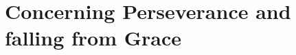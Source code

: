 \documentclass[../main.tex]{subfiles}
\begin{document}
	
	\chapter{Concerning Perseverance and falling from Grace}
	
	
	
	\theendnotes
	\setcounter{endnote}{0}
\end{document}
